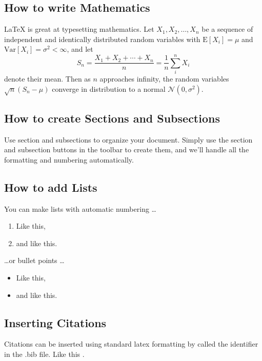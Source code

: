 \documentclass[a4paper]{article}
\begin{document}
\subsection{How to write Mathematics}

\LaTeX{} is great at typesetting mathematics. Let $X_1, X_2, \ldots, X_n$ be a sequence of independent and identically distributed random variables with $\text{E}[X_i] = \mu$ and $\text{Var}[X_i] = \sigma^2 < \infty$, and let
\[S_n = \frac{X_1 + X_2 + \cdots + X_n}{n}
      = \frac{1}{n}\sum_{i}^{n} X_i\]
denote their mean. Then as $n$ approaches infinity, the random variables $\sqrt{n}(S_n - \mu)$ converge in distribution to a normal $\mathcal{N}(0, \sigma^2)$.


\subsection{How to create Sections and Subsections}

Use section and subsections to organize your document. Simply use the section and subsection buttons in the toolbar to create them, and we'll handle all the formatting and numbering automatically.

\subsection{How to add Lists}

You can make lists with automatic numbering \dots

\begin{enumerate}
\item Like this,
\item and like this.
\end{enumerate}
\dots or bullet points \dots
\begin{itemize}
\item Like this,
\item and like this.
\end{itemize}

\subsection{Inserting Citations}
Citations can be inserted using standard latex formatting by called the identifier in the .bib file. Like this \citep{einstein1935can,Kucsko2013}.



\end{document}
